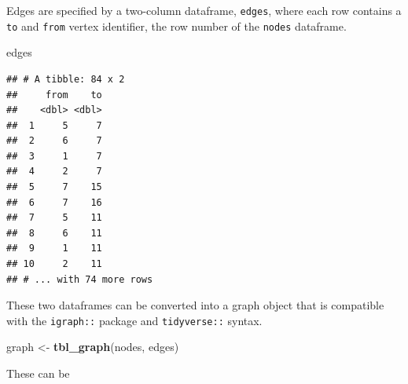 \documentclass[
]{article}
\newenvironment{Shaded}{\begin{snugshade}}{\end{snugshade}}
\newcommand{\KeywordTok}[1]{\textcolor[rgb]{0.13,0.29,0.53}{\textbf{#1}}}
\newcommand{\NormalTok}[1]{#1}
\newcommand{\StringTok}[1]{\textcolor[rgb]{0.31,0.60,0.02}{#1}}
\begin{document}
Edges are specified by a two-column dataframe, \texttt{edges}, where
each row contains a \texttt{to} and \texttt{from} vertex identifier, the
row number of the \texttt{nodes} dataframe.

\begin{Shaded}
\begin{Highlighting}[]
\NormalTok{edges}
\end{Highlighting}
\end{Shaded}

\begin{verbatim}
## # A tibble: 84 x 2
##     from    to
##    <dbl> <dbl>
##  1     5     7
##  2     6     7
##  3     1     7
##  4     2     7
##  5     7    15
##  6     7    16
##  7     5    11
##  8     6    11
##  9     1    11
## 10     2    11
## # ... with 74 more rows
\end{verbatim}

These two dataframes can be converted into a graph object that is
compatible with the \texttt{igraph::} package and \texttt{tidyverse::}
syntax.

\begin{Shaded}
\begin{Highlighting}[]
\NormalTok{graph <{-}}\StringTok{ }\KeywordTok{tbl\_graph}\NormalTok{(nodes, edges)}
\end{Highlighting}
\end{Shaded}

These can be
\end{document}
